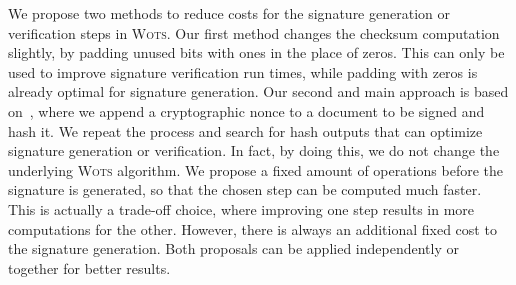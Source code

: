 \documentclass[12pt]{article}
\newcommand{\wots}{\textsc{Wots}}
\begin{document}
We propose two methods to reduce costs for the signature generation or
verification steps in \wots{}. Our first method changes the checksum
computation slightly, by padding unused bits with ones in the place of zeros.
This can only be used to improve signature verification run times, while
padding with zeros is already optimal for signature generation. Our second
and main approach is based on~\cite{Steinwandt:article:2008:oct}, where we
append a cryptographic nonce to a document to be signed and hash it. We repeat
the process and search for hash outputs that can optimize signature generation
or verification. In fact, by doing this, we do not change the underlying
\wots{} algorithm.  We propose a fixed amount of operations before the
signature is generated, so that the chosen step can be computed much faster.
This is actually a trade-off choice, where improving one step results in more
computations for the other. However, there is always an additional fixed cost
to the signature generation. Both proposals can be applied independently or
together for better results.


{\footnotesize
}
\end{document}

